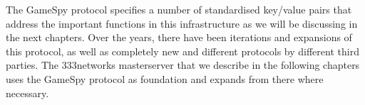 The GameSpy protocol specifies a number of standardised key/value pairs that address the important functions in this infrastructure as we will be discussing in the next chapters. Over the years, there have been iterations and expansions of this protocol, as well as completely new and different protocols by different third parties. The 333networks masterserver that we describe in the following chapters uses the GameSpy protocol as foundation and expands from there where necessary.


